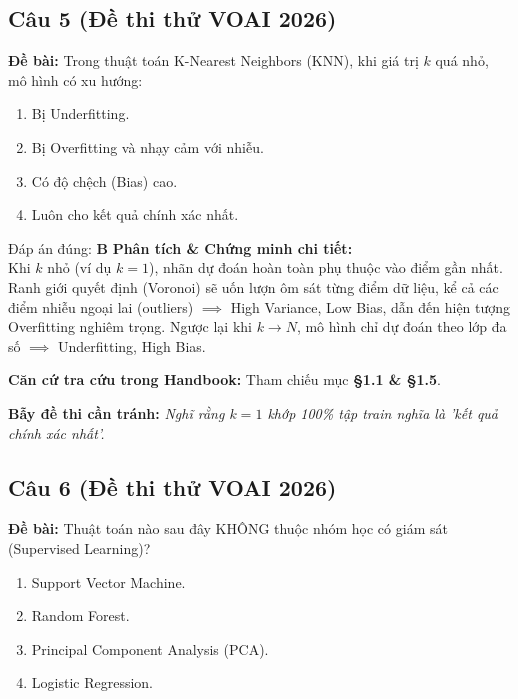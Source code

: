 \documentclass[10pt,a4paper]{article}
\begin{document}
\subsection*{Câu 5 (Đề thi thử VOAI 2026)}
\textbf{Đề bài:} Trong thuật toán K-Nearest Neighbors (KNN), khi giá trị $k$ quá nhỏ, mô hình có xu hướng:

\begin{enumerate}[label=\textbf{\Alph*.}]
    \item Bị Underfitting.
    \item Bị Overfitting và nhạy cảm với nhiễu.
    \item Có độ chệch (Bias) cao.
    \item Luôn cho kết quả chính xác nhất.
\end{enumerate}

\begin{solbox}{Đáp án đúng: \textbf{B}}
\textbf{Phân tích \& Chứng minh chi tiết:} \\
Khi $k$ nhỏ (ví dụ $k=1$), nhãn dự đoán hoàn toàn phụ thuộc vào điểm gần nhất. Ranh giới quyết định (Voronoi) sẽ uốn lượn ôm sát từng điểm dữ liệu, kể cả các điểm nhiễu ngoại lai (outliers) $\implies$ High Variance, Low Bias, dẫn đến hiện tượng Overfitting nghiêm trọng. Ngược lại khi $k \to N$, mô hình chỉ dự đoán theo lớp đa số $\implies$ Underfitting, High Bias.

\vspace{0.4em}
\textbf{Căn cứ tra cứu trong Handbook:} Tham chiếu mục \textbf{§1.1 \& §1.5}.

\vspace{0.4em}
\textbf{Bẫy đề thi cần tránh:} \textit{Nghĩ rằng $k=1$ khớp 100\% tập train nghĩa là 'kết quả chính xác nhất'.}
\end{solbox}
\vspace{0.5em}


\subsection*{Câu 6 (Đề thi thử VOAI 2026)}
\textbf{Đề bài:} Thuật toán nào sau đây KHÔNG thuộc nhóm học có giám sát (Supervised Learning)?

\begin{enumerate}[label=\textbf{\Alph*.}]
    \item Support Vector Machine.
    \item Random Forest.
    \item Principal Component Analysis (PCA).
    \item Logistic Regression.
\end{enumerate}
\end{document}
